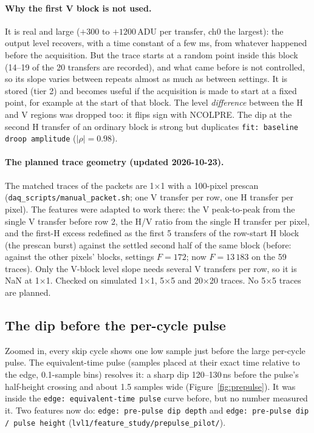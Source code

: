 \documentclass[10pt]{article}
\newcommand{\code}[1]{\texttt{#1}}
\begin{document}
\paragraph{Why the first V block is not used.} It is real and large ($+300$ to $+1200$\,ADU per transfer, ch0 the
largest): the output level recovers, with a time constant of a few ms, from whatever happened before the acquisition.
But the trace starts at a random point inside this block (14--19 of the 20 transfers are recorded), and what came
before is not controlled, so its slope varies between repeats almost as much as between settings. It is stored (tier 2)
and becomes useful if the acquisition is made to start at a fixed point, for example at the start of that block.
The level \emph{difference} between the H and V regions was dropped too: it flips sign with NCOLPRE. The dip at the
second H transfer of an ordinary block is strong but duplicates \code{fit: baseline droop amplitude} ($|\rho| = 0.98$).

\paragraph{The planned trace geometry (updated 2026-10-23).} The matched traces of the packets are 1$\times$1 with a
100-pixel prescan (\code{daq\_scripts/manual\_packet.sh}; one V transfer per row, one H transfer per pixel). The features
were adapted to work there: the V peak-to-peak from the single V transfer before row 2, the H/V ratio from the single H
transfer per pixel, and the first-H excess redefined as the first 5 transfers of the row-start H block (the prescan
burst) against the settled second half of the same block (before: against the other pixels' blocks, settings $F = 172$;
now $F = 13\,183$ on the 59 traces). Only the V-block level slope needs several V transfers per row, so it is NaN at
1$\times$1. Checked on simulated 1$\times$1, 5$\times$5 and 20$\times$20 traces. No 5$\times$5 traces are planned.

\subsection{The dip before the per-cycle pulse}
\label{sec:prepulse}

Zoomed in, every skip cycle shows one low sample just before the large per-cycle pulse. The equivalent-time pulse
(samples placed at their exact time relative to the edge, 0.1-sample bins) resolves it: a sharp dip 120--130\,ns before
the pulse's half-height crossing and about 1.5 samples wide (Figure~\ref{fig:prepulse}). It was inside the
\code{edge: equivalent-time pulse} curve before, but no number measured it. Two features now do:
\code{edge: pre-pulse dip depth} and \code{edge: pre-pulse dip / pulse height} (\code{lvl1/feature\_study/prepulse\_pilot/}).
\end{document}
